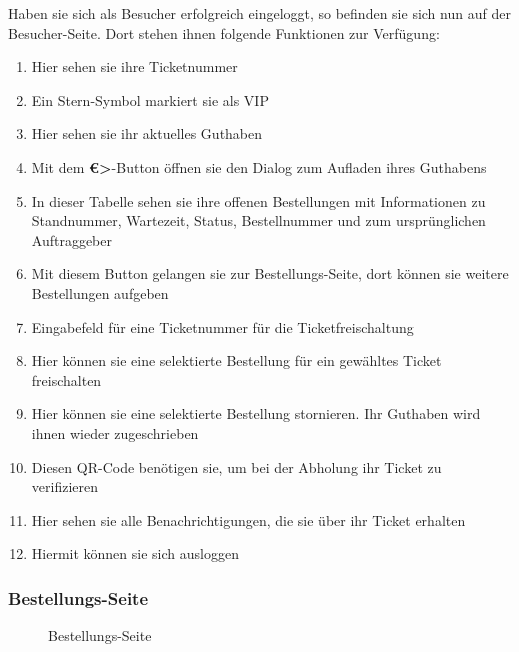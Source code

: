 Haben sie sich als Besucher erfolgreich eingeloggt, so befinden sie sich nun auf der Besucher-Seite. Dort stehen ihnen folgende Funktionen zur Verfügung:
\begin{enumerate}
    \item Hier sehen sie ihre Ticketnummer
    \item Ein Stern-Symbol markiert sie als VIP
    \item Hier sehen sie ihr aktuelles Guthaben
    \item Mit dem \textbf{€>}-Button öffnen sie den Dialog zum Aufladen ihres Guthabens
    \item In dieser Tabelle sehen sie ihre offenen Bestellungen mit Informationen zu Standnummer, Wartezeit, Status, Bestellnummer und zum ursprünglichen Auftraggeber
    \item Mit diesem Button gelangen sie zur Bestellungs-Seite, dort können sie weitere Bestellungen aufgeben
    \item Eingabefeld für eine Ticketnummer für die Ticketfreischaltung
    \item Hier können sie eine selektierte Bestellung für ein gewähltes Ticket freischalten
    \item Hier können sie eine selektierte Bestellung stornieren. Ihr Guthaben wird ihnen wieder zugeschrieben
    \item Diesen QR-Code benötigen sie, um bei der Abholung ihr Ticket zu verifizieren
    \item Hier sehen sie alle Benachrichtigungen, die sie über ihr Ticket erhalten
    \item Hiermit können sie sich ausloggen
\end{enumerate}
\clearpage

\subsubsection{Bestellungs-Seite}
\label{app:BenutzerhandbuchBestellungsSeite}

\begin{figure}[htb]
\centering
{}
\caption{Bestellungs-Seite}
\end{figure}

